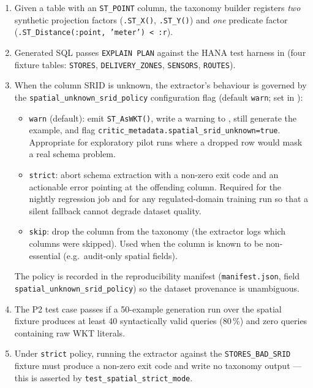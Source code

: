 \begin{enumerate}
  \item Given a table with an \texttt{ST\_POINT} column, the taxonomy
        builder registers \emph{two} synthetic projection factors
        (\texttt{.ST\_X()}, \texttt{.ST\_Y()}) and \emph{one} predicate
        factor (\texttt{.ST\_Distance(:point, 'meter') < :r}).
  \item Generated SQL passes \texttt{EXPLAIN PLAN} against the HANA
        test harness in 
        (four fixture tables: \texttt{STORES}, \texttt{DELIVERY\_ZONES},
        \texttt{SENSORS}, \texttt{ROUTES}).
  \item When the column SRID is unknown, the extractor's behaviour is
        governed by the \texttt{spatial\_unknown\_srid\_policy}
        configuration flag (default \texttt{warn}; set in
        ):
        \begin{itemize}
          \item \texttt{warn} (default): emit \texttt{ST\_AsWKT()},
                write a warning to
                , still
                generate the example, and flag
                \texttt{critic\_metadata.spatial\_srid\_unknown=true}.
                Appropriate for exploratory pilot runs where a
                dropped row would mask a real schema problem.
          \item \texttt{strict}: abort schema extraction with a
                non-zero exit code and an actionable error pointing
                at the offending column. Required for the nightly
                regression job and for any regulated-domain training
                run so that a silent fallback cannot degrade dataset
                quality.
          \item \texttt{skip}: drop the column from the taxonomy
                (the extractor logs which columns were skipped).
                Used when the column is known to be non-essential
                (e.g.\ audit-only spatial fields).
        \end{itemize}
        The policy is recorded in the reproducibility manifest
        (\texttt{manifest.json}, field
        \texttt{spatial\_unknown\_srid\_policy}) so the dataset
        provenance is unambiguous.
  \item The P2 test case passes if a 50-example generation run over
        the spatial fixture produces at least 40 syntactically valid
        queries (80\,\%) and zero queries containing raw WKT literals.
  \item Under \texttt{strict} policy, running the extractor against
        the \texttt{STORES\_BAD\_SRID} fixture must produce a
        non-zero exit code and write no taxonomy output --- this is
        asserted by \texttt{test\_spatial\_strict\_mode}.
\end{enumerate}


